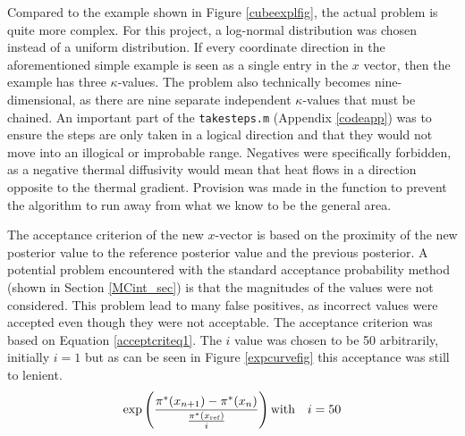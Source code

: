 	Compared to the example shown in Figure \ref{cubeexplfig}, the actual problem is quite more complex. 
	For this project, a log-normal distribution was chosen instead of a uniform distribution.
	If every coordinate direction in the aforementioned simple example is seen as a single entry in the $x$ vector, then the example has three $\kappa$-values.
	The problem also technically becomes nine-dimensional, as there are nine separate independent $\kappa$-values that must be chained.
	An important part of the \texttt{takesteps.m} (Appendix \ref{codeapp}) was to ensure the steps are only taken in a logical direction and that they would not move into an illogical or improbable range.
	Negatives were specifically forbidden, as a negative thermal diffusivity would mean that heat flows in a direction opposite to the thermal gradient.
	Provision was made in the function to prevent the algorithm to run away from what we know to be the general area. 
%
%
%
%


%	
	
	The acceptance criterion of the new $x$-vector is based on the proximity of the new posterior value to the reference posterior value and the previous posterior. 
	A potential problem encountered with the standard acceptance probability method (shown in Section \ref{MCint_sec}) is that the magnitudes of the values were not considered. 
	This problem lead to many false positives, as incorrect values were accepted even though they were not acceptable. 
	The acceptance criterion was based on Equation \ref{acceptcriteq1}.
	The $i$ value was chosen to be 50 arbitrarily, initially $i=1$ but as can be seen in Figure \ref{expcurvefig} this acceptance was still to lenient.
	\begin{equation}\label{acceptcriteq1}
	\exp\left(\frac {\pi^*(x_{n+1})-\pi^*(x_n)}{\frac{\pi^*(x_{\text{ref}})}{i}}\right)\\
	\text{with} \quad i = 50\\
	\end{equation}
	
